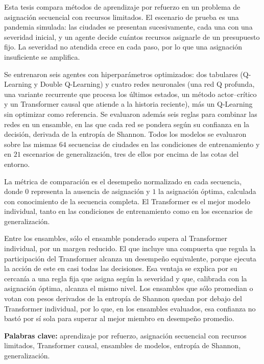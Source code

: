 \documentclass[../00_Main/Main.tex]{subfiles}
\begin{document}
Esta tesis compara m\'etodos de aprendizaje por refuerzo en un problema
de asignaci\'on secuencial con recursos limitados. El escenario de prueba es una pandemia simulada: las ciudades se presentan
sucesivamente, cada una con una severidad inicial, y un agente decide
cu\'antos recursos asignarle de un presupuesto fijo. La severidad
no atendida crece en cada paso, por lo que una asignaci\'on insuficiente
se amplifica.

Se entrenaron seis agentes con hiperpar\'ametros optimizados: dos
tabulares (Q-Learning y Double Q-Learning) y cuatro redes neuronales (una
red Q profunda, una variante recurrente que procesa los \'ultimos estados,
un m\'etodo actor--cr\'itico y un Transformer causal que atiende a la
historia reciente), m\'as un Q-Learning sin optimizar como referencia. Se
evaluaron adem\'as seis reglas para combinar las redes en un ensamble, en
las que cada red se pondera seg\'un su confianza en la decisi\'on,
derivada de la entrop\'ia de Shannon. Todos
los modelos se evaluaron sobre las mismas $64$ secuencias de ciudades en
las condiciones de entrenamiento y en $21$ escenarios de
generalizaci\'on, tres de ellos por encima de las cotas del entorno.

La m\'etrica de comparaci\'on es el desempe\~no normalizado en
cada secuencia, donde $0$ representa la ausencia de asignaci\'on y $1$ la
asignaci\'on \'optima, calculada con conocimiento de la secuencia
completa. El Transformer es el mejor modelo
individual, tanto en las condiciones de entrenamiento como en los
escenarios de generalizaci\'on.

Entre los ensambles, s\'olo el ensamble ponderado supera al Transformer
individual, por un margen reducido. El que incluye una compuerta
que regula la participaci\'on del Transformer alcanza un desempe\~no
equivalente, porque ejecuta la acci\'on de este en casi todas las
decisiones. Esa ventaja se explica por su cercan\'ia a una regla fija que asigna
seg\'un la severidad y que, calibrada con la asignaci\'on \'optima,
alcanza el mismo nivel. Los ensambles que
s\'olo promedian o votan con pesos derivados de la entrop\'ia de Shannon
quedan por debajo del Transformer individual, por lo que, en los ensambles
evaluados, esa confianza no bast\'o por s\'i sola para superar al mejor miembro en
desempe\~no promedio.

\par\vspace{0.5\baselineskip}
\noindent\textbf{Palabras clave:} aprendizaje por refuerzo, asignaci\'on
secuencial con recursos limitados, Transformer causal, ensambles de modelos,
entrop\'ia de Shannon, generalizaci\'on.

\biblio %
\end{document}
